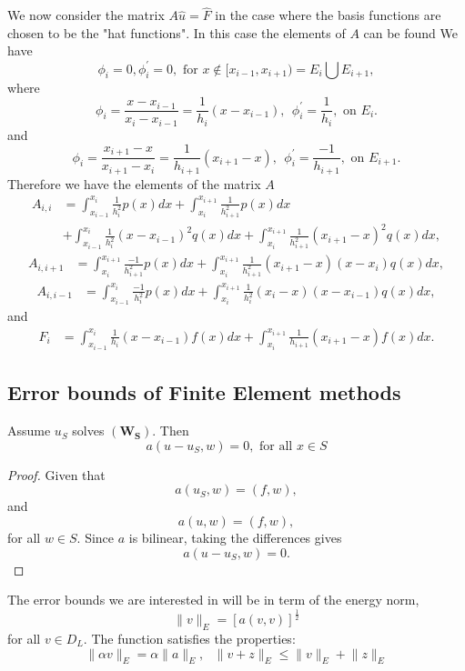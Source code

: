 We now consider the matrix $A\hat{u}=\hat{F}$ in the case where the basis functions
are chosen to be the "hat functions". In this case the elements of $A$ can be found
We have
\[\phi_i=0, \phi_i^{'}=0, \mbox{ for }  x\notin [x_{i-1},x_{i+1}) = E_{i}\bigcup E_{i+1},\]
where
\[\phi_i=\frac{x-x_{i-1}}{x_i-x_{i-1}}=\frac{1}{h_i}(x-x_{i-1}), \ \  \phi_i^{'}=\frac{1}{h_{i}}, \mbox{ on }  E_{i}.\]
and
\[\phi_i=\frac{x_{i+1}-x}{x_{i+1}-x_{i}}=\frac{1}{h_{i+1}}(x_{i+1}-x), \ \ \phi_i^{'}=\frac{-1}{h_{i+1}}, \mbox{ on }  E_{i+1}.\]
Therefore we have the elements of the matrix $A$
\[\begin{array}{ll}
A_{i,i}&=\int_{x_{i-1}}^{x_{i}}\frac{1}{h_i^2}p(x)dx +\int_{x_{i}}^{x_{i+1}}\frac{1}{h_{i+1}^2}p(x)dx \\
&+\int_{x_{i-1}}^{x_{i}}\frac{1}{h_i^2}(x-x_{i-1})^2q(x)dx +\int_{x_{i}}^{x_{i+1}}\frac{1}{h_{i+1}^2}(x_{i+1}-x)^2q(x)dx ,
\end{array}
 \]
\[\begin{array}{ll}
A_{i,i+1}&=\int_{x_{i}}^{x_{i+1}}\frac{-1}{h_{i+1}^2}p(x)dx 
+\int_{x_{i}}^{x_{i+1}}\frac{1}{h_{i+1}^2}(x_{i+1}-x)(x-x_i)q(x)dx, 
\end{array}
 \]
\[\begin{array}{ll}
A_{i,i-1}&=\int_{x_{i-1}}^{x_{i}}\frac{-1}{h_{i}^2}p(x)dx 
+\int_{x_{i}}^{x_{i+1}}\frac{1}{h_{i}^2}(x_{i}-x)(x-x_{i-1})q(x)dx, 
\end{array}
 \]
and
\[\begin{array}{ll}
F_{i}&=\int_{x_{i-1}}^{x_{i}}\frac{1}{h_{i}}(x-x_{i-1})f(x)dx 
+\int_{x_{i}}^{x_{i+1}}\frac{1}{h_{i+1}}(x_{i+1}-x)f(x)dx. 
\end{array}
 \]
\subsection{Error bounds of Finite Element methods}
\begin{lemma}
Assume $u_S$ solves $\mathbf{(W_S)}$. Then
\[a(u-u_S,w)=0, \mbox{  for all } x \in S \]
\end{lemma}

\begin{proof}
Given that
\[a(u_S,w)=(f,w), \]
and
\[a(u,w)=(f,w), \]
for all $w \in S$. Since $a$ is bilinear, taking the differences gives
\[a(u-u_S,w)=0. \]
\end{proof}

The error bounds we are interested in will be in term of the energy norm,
\[\lVert v\rVert_E=[a(v,v)]^{\frac{1}{2}} \]
for all $v\in D_L$.  The function satisfies the properties:
\[\lVert \alpha v\rVert_E=\alpha \lVert a\rVert_E, \ \ \ \lVert v+z\rVert_{E}\leq \lVert v\rVert_E+\lVert z\rVert_E \]


